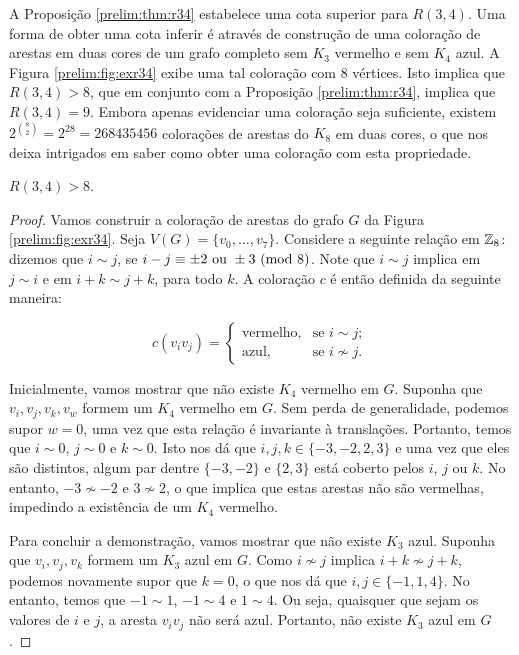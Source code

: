 A Proposição \ref{prelim:thm:r34} estabelece uma cota superior para $R(3,4)$. Uma forma de obter uma cota inferir é através de construção de uma coloração de arestas em duas cores de um grafo completo sem $K_3$ vermelho e sem $K_4$ azul.
A Figura \ref{prelim:fig:exr34} exibe uma tal coloração com 8 vértices. Isto implica que $R(3,4) > 8$, que em conjunto com a Proposição \ref{prelim:thm:r34}, implica que $R(3,4) = 9$. Embora apenas evidenciar uma coloração seja suficiente, existem $2^{\binom{8}{2}} = 2^{28} = 268435456$ colorações de arestas do $K_8$ em duas cores, o que nos deixa intrigados em saber como obter uma coloração com esta propriedade.

\begin{proposition}
\label{prelim:thm:exr34}
$R(3,4) > 8$.
\end{proposition}
\begin{proof}
Vamos construir a coloração de arestas do grafo $G$ da Figura \ref{prelim:fig:exr34}. Seja $V(G) = \{ v_0, \dots, v_7 \}$. Considere a  seguinte relação em $\mathbb{Z}_{8}$: dizemos que $i \sim j$, se $ i - j \equiv \pm 2 \text{ ou } \pm 3 \ (\text{mod}\ 8)$.
Note que $i \sim j$ implica em $ j \sim i$ e em $i + k \sim j + k$, para todo $k$. A coloração $c$ é então definida da seguinte maneira:

\[c(v_i v_j) = \begin{cases}
  \text{vermelho}, & \text{se } i \sim j; \\
  \text{azul}, & \text{se } i \not\sim j.
\end{cases}\]

Inicialmente, vamos mostrar que não existe $K_4$ vermelho em $G$. Suponha que $v_i, v_j, v_k, v_w$ formem um $K_4$ vermelho em $G$. Sem perda de generalidade, podemos supor $w = 0$, uma vez que esta relação é invariante à translações. Portanto, temos que $i \sim 0$, $j \sim 0$ e $k \sim 0$. Isto nos dá que $i,j,k \in \{-3,-2,2,3\}$ e uma vez que eles são distintos, algum par dentre $\{-3,-2\}$ e $\{2,3\}$ está coberto pelos $i$, $j$ ou $k$.
No entanto, $-3 \not\sim -2$ e $3 \not\sim 2$, o que implica que estas arestas não são vermelhas, impedindo a existência de um $K_4$ vermelho.

Para concluir a demonstração, vamos mostrar que não existe $K_3$ azul. Suponha que $v_i, v_j, v_k$ formem um $K_3$ azul em $G$. Como $i \not\sim j$ implica $i + k \not\sim j + k$, podemos novamente supor que $k = 0$, o que nos dá que $i,j \in \{-1,1,4\}$.
No entanto, temos que $-1 \sim 1$, $-1 \sim 4$ e $1 \sim 4$. Ou seja, quaisquer que sejam os valores de $i$ e $j$, a aresta $v_iv_j$ não será azul. Portanto, não existe $K_3$ azul em $G$.
\end{proof}

